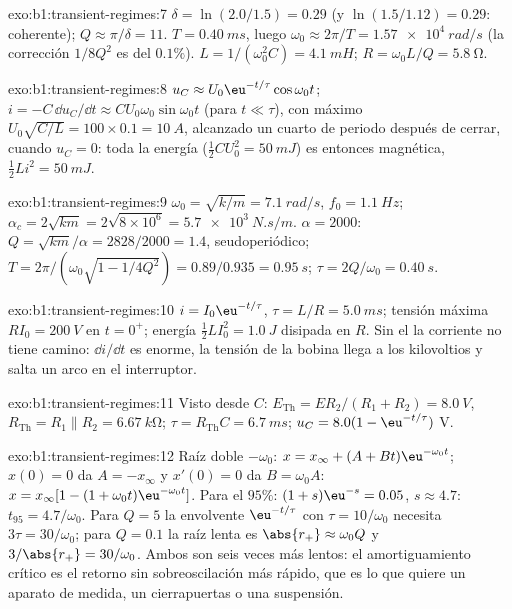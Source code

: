 \begin{solution}{exo:b1:transient-regimes:7}
$\delta = \ln(2.0/1.5) = 0.29$ (y $\ln(1.5/1.12) = 0.29$: coherente);
$Q \approx \pi/\delta = 11$. $T = \qty{0.40}{ms}$, luego $\omega_0 \approx
2\pi/T = \qty{1.57e4}{rad/s}$ (la corrección $1/8Q^2$ es del $0.1\%$).
$L = 1/(\omega_0^2 C) = \qty{4.1}{mH}$; $R = \omega_0 L/Q = \qty{5.8}{\ohm}$.
\end{solution}

\begin{solution}{exo:b1:transient-regimes:8}
$u_C \approx U_0\eu^{-t/\tau}\cos\omega_0 t$; $i = -C\,\dd u_C/\dd t
\approx CU_0\omega_0\sin\omega_0 t$ (para $t \ll \tau$), con máximo $U_0\sqrt{C/L}
= 100 \times 0.1 = \qty{10}{A}$, alcanzado un cuarto de periodo después de
cerrar, cuando $u_C = 0$: toda la energía ($\tfrac12 CU_0^2 = \qty{50}{mJ}$)
es entonces magnética, $\tfrac12 Li^2 = \qty{50}{mJ}$.
\end{solution}

\begin{solution}{exo:b1:transient-regimes:9}
$\omega_0 = \sqrt{k/m} = \qty{7.1}{rad/s}$, $f_0 = \qty{1.1}{Hz}$;
$\alpha_c = 2\sqrt{km} = 2\sqrt{8\times10^6} = \qty{5.7e3}{N.s/m}$.
$\alpha = 2000$: $Q = \sqrt{km}/\alpha = 2828/2000 = 1.4$, seudoperiódico;
$T = 2\pi/(\omega_0\sqrt{1 - 1/4Q^2}) = 0.89/0.935 = \qty{0.95}{s}$;
$\tau = 2Q/\omega_0 = \qty{0.40}{s}$.
\end{solution}

\begin{solution}{exo:b1:transient-regimes:10}
$i = I_0\eu^{-t/\tau}$, $\tau = L/R = \qty{5.0}{ms}$; tensión máxima
$RI_0 = \qty{200}{V}$ en $t = 0^+$; energía $\tfrac12 LI_0^2 = \qty{1.0}{J}$
disipada en $R$. Sin el  la corriente no tiene camino:
$\dd i/\dd t$ es enorme, la tensión de la bobina llega a los kilovoltios y
salta un arco en el interruptor.
\end{solution}

\begin{solution}{exo:b1:transient-regimes:11}
Visto desde $C$: $E_{\mathrm{Th}} = ER_2/(R_1 + R_2) = \qty{8.0}{V}$,
$R_{\mathrm{Th}} = R_1 \parallel R_2 = \qty{6.67}{k\ohm}$; $\tau =
R_{\mathrm{Th}}C = \qty{6.7}{ms}$; $u_C = 8.0(1 - \eu^{-t/\tau})$ V.
\end{solution}

\begin{solution}{exo:b1:transient-regimes:12}
Raíz doble $-\omega_0$: $x = x_\infty + (A + Bt)\eu^{-\omega_0 t}$;
$x(0) = 0$ da $A = -x_\infty$ y $x'(0) = 0$ da $B = \omega_0 A$:
$x = x_\infty[1 - (1 + \omega_0 t)\eu^{-\omega_0 t}]$. Para el $95\%$:
$(1 + s)\eu^{-s} = 0.05$, $s \approx 4.7$: $t_{95} = 4.7/\omega_0$. Para
$Q = 5$ la envolvente $\eu^{-t/\tau}$ con $\tau = 10/\omega_0$ necesita
$3\tau = 30/\omega_0$; para $Q = 0.1$ la raíz lenta es $\abs{r_+} \approx
\omega_0 Q$ y $3/\abs{r_+} = 30/\omega_0$. Ambos son seis veces más
lentos: el amortiguamiento crítico es el retorno sin sobreoscilación más
rápido, que es lo que quiere un aparato de medida, un cierrapuertas o una
suspensión.
\end{solution}

